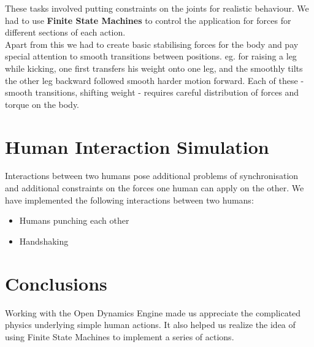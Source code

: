 \documentclass[11pt]{article}
\begin{document}
These tasks involved putting constraints on the joints for realistic behaviour.
We had to use  \textbf{Finite State Machines} to control the application for
forces for different sections of each action.\\
Apart from this we had to create basic stabilising forces for the body and
pay special attention to smooth transitions between positions. eg. for raising
a leg while kicking, one first transfers his weight onto one leg, and the 
smoothly tilts the other leg backward followed smooth harder motion forward.
Each of these - smooth transitions, shifting weight - requires careful
distribution of forces and torque on the body.


\section{Human Interaction Simulation}
Interactions between two humans pose additional problems of synchronisation
and additional constraints on the forces one human can apply on the other.
We have implemented the following interactions between two humans:\\
\begin{itemize}
    \item Humans punching each other
    \item Handshaking
\end{itemize}


\section{Conclusions}
Working with the Open Dynamics Engine made us appreciate the complicated
physics underlying simple human actions. It also helped us realize the 
idea of using Finite State Machines to implement a series of actions.
\end{document}
